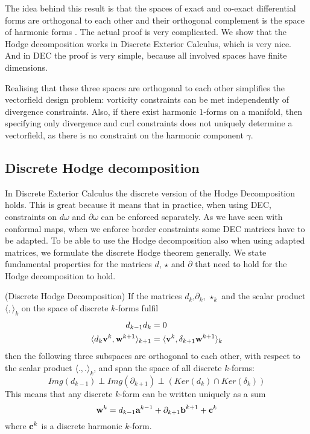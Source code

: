 The idea  behind this result is that the spaces of exact and co-exact differential forms are orthogonal to each other and their orthogonal complement is the space of harmonic forms . The actual proof is very complicated.
We show that the Hodge decomposition works in Discrete Exterior Calculus, which is very nice. And in DEC the proof is very simple, because all involved spaces have finite dimensions. 

Realising that these three spaces are orthogonal to each other simplifies the vectorfield design problem: vorticity constraints can be met independently of divergence constraints. %
Also, if there exist harmonic $1$-forms on a manifold, then specifying only divergence and curl constraints does not uniquely determine a vectorfield, as there is no constraint on the harmonic component $\gamma$.

\subsection{Discrete Hodge decomposition}
In Discrete Exterior Calculus the discrete version of the Hodge Decomposition holds. This is great because it means that in practice, when using DEC, constraints on $d\omega$ and $\partial \omega$ can be enforced separately. As we have seen with conformal maps, when we enforce border constraints some DEC matrices have to be adapted. To be able to use the Hodge decomposition also when using adapted matrices, we formulate the discrete Hodge theorem generally. We state fundamental properties for the matrices $d$, $\star$ and $\partial$ that need to hold for the Hodge decomposition to hold. 

\begin{thm}(Discrete Hodge Decomposition) If the matrices $d_k$,$\partial_k$, $\star_k$ and the scalar product $\langle , \rangle_k$ on the space of discrete $k$-forms fulfil
\begin{align}
d_{k-1} d_{k} &= 0 \\
\langle  d_k\textbf{v}^k,\textbf{w}^{k+1} \rangle_{k+1} &= \langle  \textbf{v}^k,\delta_{k+1}\textbf{w}^{k+1} \rangle_k \label{eq:adjoint}
\end{align}
then the following three subspaces are orthogonal to each other, with respect to the scalar product $\langle.,.\rangle_k$, and span the space of all discrete $k$-forms:
\[Img(d_{k-1}) \perp Img (\partial_{k+1}) \perp \left(Ker(d_k) \cap Ker(\delta_k)\right)\]
This means that any discrete $k$-form can be written uniquely as a sum
\[\textbf{w}^k = d_{k-1} \textbf{a}^{k-1} + \partial_{k+1} \textbf{b}^{k+1} + \textbf{c}^k\]
where $\textbf{c}^k$ is a discrete harmonic $k$-form.
\end{thm}

